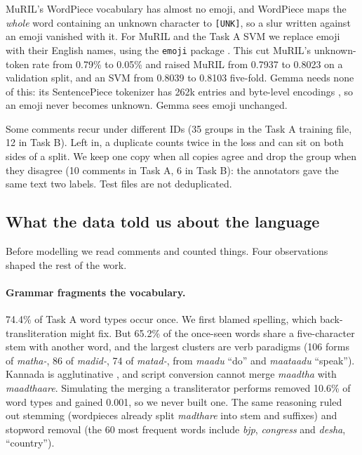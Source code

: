 \documentclass[11pt]{article}
\newcommand{\taska}{Task A}
\newcommand{\taskb}{Task B}
\begin{document}
MuRIL's WordPiece \citep{wu-etal-2016-google, devlin-etal-2019-bert} vocabulary
has almost no emoji, and WordPiece maps the
\emph{whole} word containing an unknown character to \texttt{[UNK]}, so a slur
written against an emoji vanished with it. For MuRIL and the \taska{} SVM we
replace emoji with their English names, using the \texttt{emoji} package
\citep{kim-wurster-emoji}. This cut MuRIL's unknown-token rate from
0.79\% to 0.05\% and raised MuRIL from 0.7937 to 0.8023 on a validation split, and
an SVM from 0.8039 to 0.8103 five-fold. Gemma needs none of this: its SentencePiece
tokenizer \citep{kudo-richardson-2018-sentencepiece} has 262k entries and
byte-level encodings \citep{gemma-team-2026-gemma4}, so an emoji never becomes
unknown. Gemma sees emoji unchanged.

Some comments recur under different IDs (35 groups in the \taska{} training file,
12 in \taskb{}). Left in, a duplicate counts twice in the loss and can sit on both
sides of a split. We keep one copy when all copies agree and drop the group when
they disagree (10 comments in \taska{}, 6 in \taskb{}): the annotators gave the
same text two labels. Test files are not deduplicated.

\subsection{What the data told us about the language}
\label{sec:language}
Before modelling we read comments and counted things. Four observations shaped
the rest of the work.

\paragraph{Grammar fragments the vocabulary.} 74.4\% of \taska{} word types occur
once. We first blamed spelling, which back-transliteration might fix. But 65.2\%
of the once-seen words share a five-character stem with another word, and the
largest clusters are verb paradigms (106 forms of \textit{matha-}, 86 of
\textit{madid-}, 74 of \textit{matad-}, from \textit{maadu} ``do'' and
\textit{maataadu} ``speak''). Kannada is agglutinative \citep{sridhar-1990-kannada}, and script conversion
cannot merge \textit{maadtha} with \textit{maadthaare}. Simulating the merging a
transliterator performs removed 10.6\% of word types and gained 0.001, so we never
built one. The same reasoning ruled out stemming (wordpieces already split
\textit{madthare} into stem and suffixes) and stopword removal (the 60 most
frequent words include \textit{bjp}, \textit{congress} and \textit{desha},
``country'').
\end{document}

